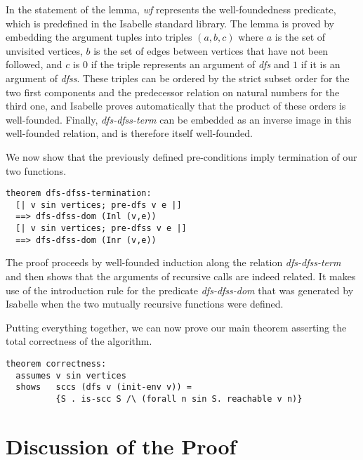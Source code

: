 \documentclass[sigplan,10pt,anonymous,review]{acmart}
\newcommand{\prog}[1]{\textit{#1}}
\begin{document}
In the statement of the lemma, \prog{wf} represents the well-foundedness predicate, which is predefined in the Isabelle standard library. The lemma is proved by embedding the argument tuples into triples $(a,b,c)$ where $a$ is the set of unvisited vertices, $b$ is the set of edges between vertices that have not been followed, and $c$ is $0$ if the triple represents an argument of \prog{dfs} and $1$ if it is an argument of \prog{dfss}. These triples can be ordered by the strict subset order for the two first components and the predecessor relation on natural numbers for the third one, and Isabelle proves automatically that the product of these orders is well-founded. Finally, \prog{dfs-dfss-term} can be embedded as an inverse image in this well-founded relation, and is therefore itself well-founded.

We now show that the previously defined pre-conditions imply termination of our two functions.

\begin{small}
\begin{lstlisting}[language=isabelle]
theorem dfs-dfss-termination:
  [| v sin vertices; pre-dfs v e |] 
  ==> dfs-dfss-dom (Inl (v,e))
  [| v sin vertices; pre-dfss v e |] 
  ==> dfs-dfss-dom (Inr (v,e))
\end{lstlisting}
\end{small}

The proof proceeds by well-founded induction along the relation \prog{dfs-dfss-term} and then shows that the arguments of recursive calls are indeed related. It makes use of the introduction rule for the predicate \prog{dfs-dfss-dom} that was generated by Isabelle when the two mutually recursive functions were defined.

Putting everything together, we can now prove our main theorem asserting the total correctness of the algorithm.

\begin{small}
\begin{lstlisting}[language=isabelle]
theorem correctness:
  assumes v sin vertices
  shows   sccs (dfs v (init-env v)) = 
          {S . is-scc S /\ (forall n sin S. reachable v n)}
\end{lstlisting}
\end{small}


\section{Discussion of the Proof}
\label{sec:discussion}
\end{document}
